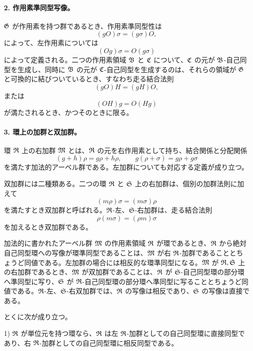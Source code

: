 \paragraph{2. 作用素準同型写像。}
\(\mathfrak G\) が作用素を持つ群であるとき、作用素準同型性は
\[
        (gO)\sigma=(g\sigma)O,                                          \tag{2}
\]
によって、左作用素については
\[
        (Og)\sigma=O(g\sigma)                                           \tag{2*}
\]
によって定義される。二つの作用素領域 \(\mathfrak B\) と \(\mathfrak C\) について、\(\mathfrak C\) の元が \(\mathfrak B\)-自己同型を生成し、同時に \(\mathfrak B\) の元が \(\mathfrak C\)-自己同型を生成するのは、それらの領域が \(\mathfrak G\) と可換的に結びついているとき、すなわち走る結合法則
\[
        (gO)H=(gH)O,                                                    \tag{2a}
\]
または
\[
        (OH)g=O(Hg)                                                     \tag{2a*}
\]
が満たされるとき、かつそのときに限る。

\paragraph{3. 環上の加群と双加群。}
環 \(\mathfrak R\) 上の右加群 \(\mathfrak M\) とは、\(\mathfrak R\) の元を右作用素として持ち、結合関係と分配関係
\[
        (g+h)\rho=g\rho+h\rho,
        \qquad
        g(\rho+\sigma)=g\rho+g\sigma                                  \tag{3a}
\]
を満たす加法的アーベル群である。左加群についても対応する定義が成り立つ。

双加群には二種類ある。二つの環 \(\mathfrak R\) と \(\mathfrak S\) 上の右加群は、個別の加群法則に加えて
\[
        (m\rho)\sigma=(m\sigma)\rho
\]
を満たすとき双加群と呼ばれる。\(\mathfrak R\)-左、\(\mathfrak S\)-右加群は、走る結合法則
\[
        \rho(m\sigma)=(\rho m)\sigma
\]
を加えるとき双加群である。

加法的に書かれたアーベル群 \(\mathfrak M\) の作用素領域 \(\mathfrak R\) が環であるとき、\(\mathfrak R\) から絶対自己同型環への写像が環準同型であることは、\(\mathfrak M\) が右 \(\mathfrak R\)-加群であることとちょうど同値である。左加群の場合には相反的な環準同型になる。\(\mathfrak M\) が \(\mathfrak R,\mathfrak S\) 上の右加群であるとき、\(\mathfrak M\) が双加群であることは、\(\mathfrak R\) が \(\mathfrak S\)-自己同型環の部分環へ準同型に写り、\(\mathfrak S\) が \(\mathfrak R\)-自己同型環の部分環へ準同型に写ることとちょうど同値である。\(\mathfrak R\)-左、\(\mathfrak S\)-右双加群では、\(\mathfrak R\) の写像は相反であり、\(\mathfrak S\) の写像は直接である。

とくに次が成り立つ。

1) \(\mathfrak R\) が単位元を持つ環なら、\(\mathfrak R\) は左 \(\mathfrak R\)-加群としての自己同型環に直接同型であり、右 \(\mathfrak R\)-加群としての自己同型環に相反同型である。


